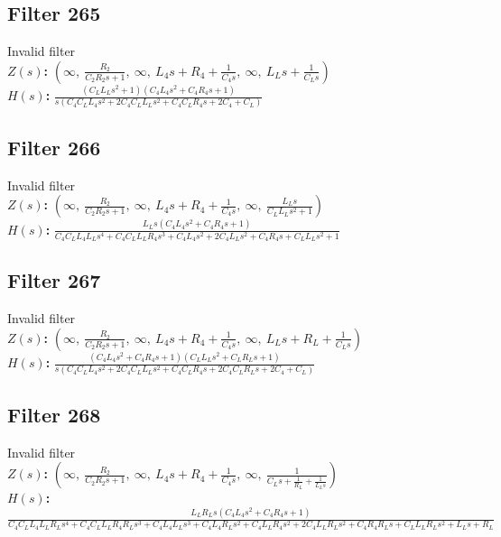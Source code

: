 \documentclass{article}
\begin{document}
\subsection*{Filter 265}
Invalid filter \\ 
\textbf{$Z(s)$:} $\left( \infty, \  \frac{R_{2}}{C_{2} R_{2} s + 1}, \  \infty, \  L_{4} s + R_{4} + \frac{1}{C_{4} s}, \  \infty, \  L_{L} s + \frac{1}{C_{L} s}\right)$ \\ 
\textbf{$H(s)$:} $\frac{\left(C_{L} L_{L} s^{2} + 1\right) \left(C_{4} L_{4} s^{2} + C_{4} R_{4} s + 1\right)}{s \left(C_{4} C_{L} L_{4} s^{2} + 2 C_{4} C_{L} L_{L} s^{2} + C_{4} C_{L} R_{4} s + 2 C_{4} + C_{L}\right)}$ \\ 
\subsection*{Filter 266}
Invalid filter \\ 
\textbf{$Z(s)$:} $\left( \infty, \  \frac{R_{2}}{C_{2} R_{2} s + 1}, \  \infty, \  L_{4} s + R_{4} + \frac{1}{C_{4} s}, \  \infty, \  \frac{L_{L} s}{C_{L} L_{L} s^{2} + 1}\right)$ \\ 
\textbf{$H(s)$:} $\frac{L_{L} s \left(C_{4} L_{4} s^{2} + C_{4} R_{4} s + 1\right)}{C_{4} C_{L} L_{4} L_{L} s^{4} + C_{4} C_{L} L_{L} R_{4} s^{3} + C_{4} L_{4} s^{2} + 2 C_{4} L_{L} s^{2} + C_{4} R_{4} s + C_{L} L_{L} s^{2} + 1}$ \\ 
\subsection*{Filter 267}
Invalid filter \\ 
\textbf{$Z(s)$:} $\left( \infty, \  \frac{R_{2}}{C_{2} R_{2} s + 1}, \  \infty, \  L_{4} s + R_{4} + \frac{1}{C_{4} s}, \  \infty, \  L_{L} s + R_{L} + \frac{1}{C_{L} s}\right)$ \\ 
\textbf{$H(s)$:} $\frac{\left(C_{4} L_{4} s^{2} + C_{4} R_{4} s + 1\right) \left(C_{L} L_{L} s^{2} + C_{L} R_{L} s + 1\right)}{s \left(C_{4} C_{L} L_{4} s^{2} + 2 C_{4} C_{L} L_{L} s^{2} + C_{4} C_{L} R_{4} s + 2 C_{4} C_{L} R_{L} s + 2 C_{4} + C_{L}\right)}$ \\ 
\subsection*{Filter 268}
Invalid filter \\ 
\textbf{$Z(s)$:} $\left( \infty, \  \frac{R_{2}}{C_{2} R_{2} s + 1}, \  \infty, \  L_{4} s + R_{4} + \frac{1}{C_{4} s}, \  \infty, \  \frac{1}{C_{L} s + \frac{1}{R_{L}} + \frac{1}{L_{L} s}}\right)$ \\ 
\textbf{$H(s)$:} $\frac{L_{L} R_{L} s \left(C_{4} L_{4} s^{2} + C_{4} R_{4} s + 1\right)}{C_{4} C_{L} L_{4} L_{L} R_{L} s^{4} + C_{4} C_{L} L_{L} R_{4} R_{L} s^{3} + C_{4} L_{4} L_{L} s^{3} + C_{4} L_{4} R_{L} s^{2} + C_{4} L_{L} R_{4} s^{2} + 2 C_{4} L_{L} R_{L} s^{2} + C_{4} R_{4} R_{L} s + C_{L} L_{L} R_{L} s^{2} + L_{L} s + R_{L}}$ \\ 
\end{document}
